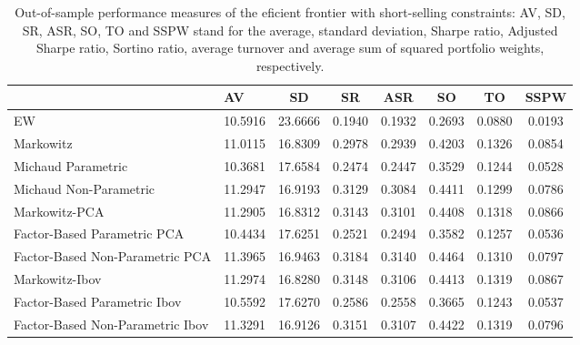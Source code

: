 \begin{table}

\caption{\label{tab:empirical_ef_2}Out-of-sample performance measures of the eficient frontier with short-selling constraints: AV, SD, SR, ASR, SO, TO and SSPW stand for the average, standard deviation, Sharpe ratio, Adjusted Sharpe ratio, Sortino ratio, average turnover and average sum of squared portfolio weights, respectively.}
\centering
\begin{tabular}[t]{l|l|c|c|c|c|c|c}
\hline
  & AV & SD & SR & ASR & SO & TO & SSPW\\
\hline
EW & 10.5916 & 23.6666 & 0.1940 & 0.1932 & 0.2693 & 0.0880 & 0.0193\\
\hline
Markowitz & 11.0115 & 16.8309 & 0.2978 & 0.2939 & 0.4203 & 0.1326 & 0.0854\\
\hline
Michaud Parametric & 10.3681 & 17.6584 & 0.2474 & 0.2447 & 0.3529 & 0.1244 & 0.0528\\
\hline
Michaud Non-Parametric & 11.2947 & 16.9193 & 0.3129 & 0.3084 & 0.4411 & 0.1299 & 0.0786\\
\hline
Markowitz-PCA & 11.2905 & 16.8312 & 0.3143 & 0.3101 & 0.4408 & 0.1318 & 0.0866\\
\hline
Factor-Based Parametric PCA & 10.4434 & 17.6251 & 0.2521 & 0.2494 & 0.3582 & 0.1257 & 0.0536\\
\hline
Factor-Based Non-Parametric PCA & 11.3965 & 16.9463 & 0.3184 & 0.3140 & 0.4464 & 0.1310 & 0.0797\\
\hline
Markowitz-Ibov & 11.2974 & 16.8280 & 0.3148 & 0.3106 & 0.4413 & 0.1319 & 0.0867\\
\hline
Factor-Based Parametric Ibov & 10.5592 & 17.6270 & 0.2586 & 0.2558 & 0.3665 & 0.1243 & 0.0537\\
\hline
Factor-Based Non-Parametric Ibov & 11.3291 & 16.9126 & 0.3151 & 0.3107 & 0.4422 & 0.1319 & 0.0796\\
\hline
\end{tabular}
\end{table}
